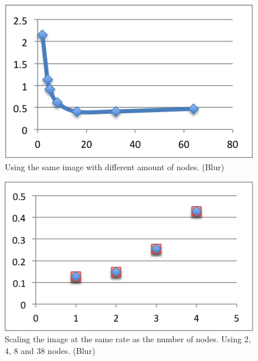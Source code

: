 \documentclass[a4paper]{article}
\begin{document}
\begin{figure}[h]
  \centering
  \includegraphics{imageBlur.png}
  \caption{Using the same image with different amount of nodes. (Blur)}
  \label{fig:fig5}
\end{figure}

\begin{figure}[h]
  \centering
  \includegraphics{scaleBlur.png}
  \caption{Scaling the image at the same rate as the number of nodes. Using 2, 4, 8 and 38 nodes. (Blur)}
  \label{fig:fig6}
\end{figure}
\end{document}
